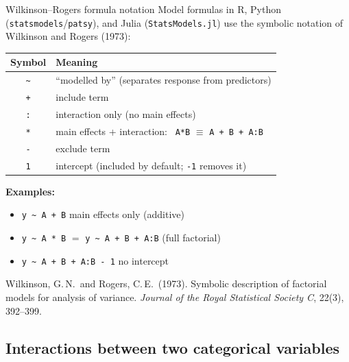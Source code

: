 \documentclass[10pt,ignorenonframetext,aspectratio=169]{beamer}
\begin{document}
\begin{frame}{Wilkinson--Rogers formula notation}
    Model formulas in R, Python (\texttt{statsmodels}/\texttt{patsy}), and Julia (\texttt{StatsModels.jl}) use the symbolic notation of Wilkinson and Rogers (1973):

    \medskip
    \begin{table}[h]\centering\small
    \begin{tabular}{cl}
    \hline
    \textbf{Symbol} & \textbf{Meaning} \\
    \hline
    \texttt{\textasciitilde} & ``modelled by'' (separates response from predictors) \\
    \texttt{+} & include term \\
    \texttt{:} & interaction only (no main effects) \\
    \texttt{*} & main effects + interaction: \ \texttt{A*B} $\equiv$ \texttt{A + B + A:B} \\
    \texttt{-} & exclude term \\
    \texttt{1} & intercept (included by default; \texttt{-1} removes it) \\
    \hline
    \end{tabular}
    \end{table}

    \medskip
    \textbf{Examples:}
    \begin{itemize}
        \item \texttt{y \textasciitilde{} A + B} \quad main effects only (additive)
        \item \texttt{y \textasciitilde{} A * B} \quad $=$ \texttt{y \textasciitilde{} A + B + A:B} \quad (full factorial)
        \item \texttt{y \textasciitilde{} A + B + A:B - 1} \quad no intercept
    \end{itemize}

    \medskip
    {\scriptsize Wilkinson, G.\,N.\ and Rogers, C.\,E.\ (1973). Symbolic description of factorial models for analysis of variance. \textit{Journal of the Royal Statistical Society C}, 22(3), 392--399.}
\end{frame}

\subsection{Interactions between two categorical variables}
\end{document}
